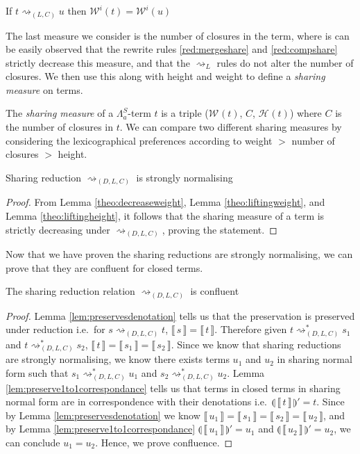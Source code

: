 \documentclass[a4paper,UKenglish,cleveref, autoref]{lipics-v2019}
\newcommand{\FALC}{\Lambda^{S}_{a}}
\newcommand{\readback}[2]{\llbracket \, #1 \, \rrbracket}
\newcommand{\compile}[1]{\llparenthesis \, #1 \, \rrparenthesis}
\newcommand{\height}[2]{\mathcal{H}^{#1}(#2)}
\newcommand{\weight}[2]{\mathcal{W}^{#1}(#2)}
\begin{document}
\begin{lemma}
\label{theo:liftingweight}
If $t \rightsquigarrow_{(L, C)} u$ then $\weight{i}{t} = \weight{i}{u}$
\end{lemma}

The last measure we consider is the number of closures in the term, where is can be easily observed that the rewrite rules \ref{red:mergeshare} and \ref{red:compshare} strictly decrease this measure, and that the $\rightsquigarrow_{L}$ rules do not alter the number of closures. We then use this along with height and weight to define a \emph{sharing measure} on terms.

\begin{definition}
\label{def:sharingmeasure}
The \emph{sharing measure} of a $\FALC$-term $t$ is a triple ($\weight{}{t}$, $C$, $\height{}{t}$) where $C$ is the number of closures in $t$. We can compare two different sharing measures by considering the lexicographical preferences according to weight $>$ number of closures $>$ height.
\end{definition}

\begin{theorem}
\label{theo:sharingstronglynormal}
Sharing reduction $\rightsquigarrow_{(D, L, C)}$ is strongly normalising
\end{theorem}
\begin{proof}
From Lemma \ref{theo:decreaseweight}, Lemma \ref{theo:liftingweight}, and Lemma \ref{theo:liftingheight}, it follows that the sharing measure of a term is strictly decreasing under $\rightsquigarrow_{(D, L, C)}$, proving the statement.
\end{proof}

\noindent Now that we have proven the sharing reductions are strongly normalising, we can prove that they are confluent for closed terms.

\begin{theorem}
\label{theo:strongnormal}
The sharing reduction relation $\rightsquigarrow_{(D, L, C)}$ is confluent
\end{theorem}
\begin{proof}
 Lemma \ref{lem:preservesdenotation} tells us that the preservation is preserved under reduction i.e.\ for $s \rightsquigarrow_{(D, L, C)} t$, $\readback{s}{} = \readback{t}{}$. Therefore given $t \rightsquigarrow^{*}_{(D, L, C)} s_{1}$ and $t \rightsquigarrow^{*}_{(D, L, C)} s_{2}$, $\readback{t}{} = \readback{s_{1}}{} = \readback{s_{2}}{}$. Since we know that sharing reductions are strongly normalising, we know there exists terms $u_{1}$ and $u_{2}$ in sharing normal form such that $s_{1} \rightsquigarrow^{*}_{(D, L, C)} u_{1}$ and $s_{2} \rightsquigarrow^{*}_{(D, L, C)} u_{2}$. Lemma \ref{lem:preserve1to1correspondance} tells us that terms in closed terms in sharing normal form are in correspondence with their denotations i.e.\ $ \compile{\readback{t}{I}}' = t $. Since by Lemma \ref{lem:preservesdenotation} we know $\readback{u_{1}}{} = \readback{s_{1}}{} = \readback{s_{2}}{} = \readback{u_{2}}{}$, and by Lemma \ref{lem:preserve1to1correspondance} $ \compile{\readback{u_{1}}{I}}' = u_{1} $ and $\compile{\readback{u_{2}}{I}}' = u_{2}$, we can conclude $u_{1} = u_{2}$. Hence, we prove confluence.
\end{proof}
\end{document}
